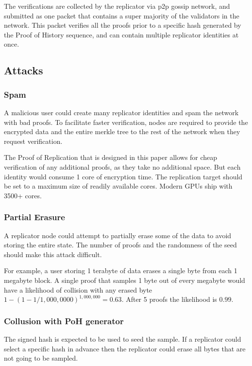 \documentclass[12pt]{article}
\begin{document}
The verifications are collected by the replicator via p2p gossip network, and submitted as one packet that contains a super majority of the validators in the network. This packet verifies all the proofs prior to a specific hash generated by the Proof of History sequence, and can contain multiple replicator identities at once.
\subsection{Attacks}
\subsubsection{Spam}
A malicious user could create many replicator identities and spam the network with bad proofs. To facilitate faster verification, nodes are required to provide the encrypted data and the entire merkle tree to the rest of the network when they request verification.

The Proof of Replication that is designed in this paper allows for cheap verification of any additional proofs, as they take no additional space. But each identity would consume 1 core of encryption time. The replication target should be set to a maximum size of readily available cores. Modern GPUs ship with 3500+ cores.

\subsubsection{Partial Erasure}

A replicator node could attempt to partially erase some of the data to avoid storing the entire state. The number of proofs and the randomness of the seed should make this attack difficult.

For example, a user storing 1 terabyte of data erases a single byte from each 1 megabyte block. A single proof that samples 1 byte out of every megabyte would have a likelihood of collision with any erased byte \(1 - (1- 1/1,000,0000)^{1,000,000} = 0.63\). After 5 proofs the likelihood is \(0.99\).

\subsubsection{Collusion with PoH generator}

The signed hash is expected to be used to seed the sample. If a replicator could select a specific hash in advance then the replicator could erase all bytes that are not going to be sampled.
\end{document}
